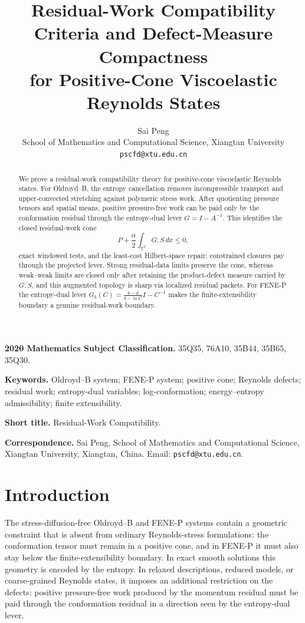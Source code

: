 \documentclass[11pt]{article}
\title{Residual-Work Compatibility Criteria and Defect-Measure Compactness\\
for Positive-Cone Viscoelastic Reynolds States}
\author{Sai Peng\\
School of Mathematics and Computational Science, Xiangtan University\\
\texttt{pscfd@xtu.edu.cn}}
\date{}
\numberwithin{equation}{section}
\begin{document}
\maketitle

\begin{abstract}
We prove a residual-work compatibility theory for positive-cone viscoelastic
Reynolds states.  For Oldroyd--B, the entropy cancellation removes
incompressible transport and upper-convected stretching against polymeric stress
work.  After quotienting pressure tensors and spatial means, positive
pressure-free work can be paid only by the conformation residual through the
entropy-dual lever $G=I-A^{-1}$.  This identifies the closed residual-work cone
\[
  P+\frac{\alpha}{2}\int_{\mathbb T^d}G:S\,dx\le0,
\]
exact windowed tests, and the least-cost Hilbert-space repair; constrained
closures pay through the projected lever.  Strong residual-data limits preserve
the cone, whereas weak--weak limits are closed only after retaining the
product-defect measure carried by $G:S$, and this augmented topology is sharp
via localized residual packets.  For FENE-P the entropy-dual lever
$G_b(C)=\frac{b-d}{b-\operatorname{tr}C}I-C^{-1}$ makes the
finite-extensibility boundary a genuine residual-work boundary.
\end{abstract}

\noindent\textbf{2020 Mathematics Subject Classification.}
35Q35, 76A10, 35B44, 35B65, 35Q30.

\noindent\textbf{Keywords.}
Oldroyd--B system; FENE-P system; positive cone; Reynolds defects; residual
work; entropy-dual variables; log-conformation; energy--entropy admissibility;
finite extensibility.

\noindent\textbf{Short title.}
Residual-Work Compatibility.

\noindent\textbf{Correspondence.}
Sai Peng, School of Mathematics and Computational Science, Xiangtan
University, Xiangtan, China. Email: \texttt{pscfd@xtu.edu.cn}.

\section{Introduction}

The stress-diffusion-free Oldroyd--B and FENE-P systems contain a geometric
constraint that is absent from ordinary Reynolds-stress formulations: the
conformation tensor must remain in a positive cone, and in FENE-P it must also
stay below the finite-extensibility boundary.  In exact smooth solutions this
geometry is encoded by the entropy.  In relaxed descriptions, reduced models,
or coarse-grained Reynolds states, it imposes an additional restriction on the
defects: positive pressure-free work produced by the momentum residual must be
paid through the conformation residual in a direction seen by the entropy-dual
lever.
\end{document}
